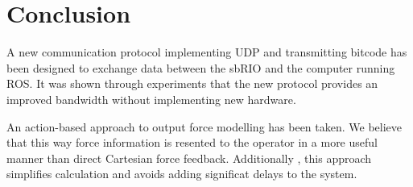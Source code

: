 \section{Conclusion}
A new communication protocol implementing UDP and transmitting bitcode has been designed to exchange data between the sbRIO and the computer running ROS. It was shown through experiments that the new protocol provides an improved bandwidth without implementing new hardware. 

An action-based approach to output force modelling has been taken. 
We believe that this way force information is resented to the operator in a more useful manner than direct Cartesian force feedback.
Additionally , this approach simplifies calculation and avoids adding significat delays to the system.